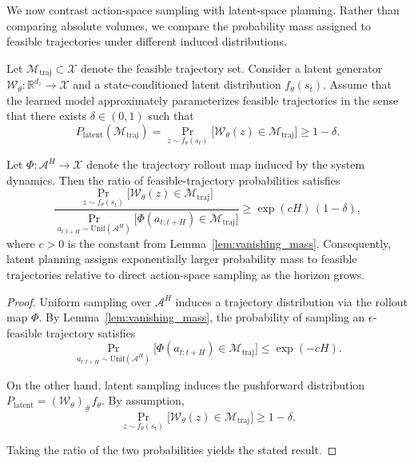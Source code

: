 

We now contrast action-space sampling with latent-space planning.
Rather than comparing absolute volumes,
we compare the probability mass assigned to feasible trajectories
under different induced distributions.

\begin{proposition}
\label{prop:latent_reweighting}
Let $\mathcal{M}_{\mathrm{traj}} \subset \mathcal{X}$ denote the feasible trajectory set.
Consider a latent generator
$\mathcal{W}_\theta : \mathbb{R}^{d_z} \to \mathcal{X}$
and a state-conditioned latent distribution $f_\theta(s_t)$.
Assume that the learned model approximately parameterizes feasible trajectories
in the sense that there exists $\delta \in (0,1)$ such that
\begin{equation}
P_{\mathrm{latent}}(\mathcal{M}_{\mathrm{traj}})
=
\Pr_{z \sim f_\theta(s_t)}
\big[
\mathcal{W}_\theta(z) \in \mathcal{M}_{\mathrm{traj}}
\big]
\ge 1 - \delta .
\end{equation}

Let $\Phi : \mathcal{A}^H \to \mathcal{X}$ denote the trajectory rollout map
induced by the system dynamics.
Then the ratio of feasible-trajectory probabilities satisfies
\begin{equation}
\frac{
\Pr_{z \sim f_\theta(s_t)}
\big[
\mathcal{W}_\theta(z) \in \mathcal{M}_{\mathrm{traj}}
\big]
}{
\Pr_{a_{t:t+H} \sim \mathrm{Unif}(\mathcal{A}^H)}
\big[
\Phi(a_{t:t+H}) \in \mathcal{M}_{\mathrm{traj}}
\big]
}
\ge
\exp(cH)\,(1-\delta),
\end{equation}
where $c>0$ is the constant from Lemma~\ref{lem:vanishing_mass}.
Consequently, latent planning assigns exponentially larger probability mass
to feasible trajectories relative to direct action-space sampling
as the horizon grows.
\end{proposition}

\begin{proof}
Uniform sampling over $\mathcal{A}^H$ induces a trajectory distribution
via the rollout map $\Phi$.
By Lemma~\ref{lem:vanishing_mass},
the probability of sampling an $\epsilon$-feasible trajectory satisfies
\[
\Pr_{a_{t:t+H} \sim \mathrm{Unif}(\mathcal{A}^H)}
\big[
\Phi(a_{t:t+H}) \in \mathcal{M}_{\mathrm{traj}}
\big]
\le \exp(-cH).
\]

On the other hand, latent sampling induces the pushforward distribution
$P_{\mathrm{latent}} = (\mathcal{W}_\theta)_\# f_\theta$.
By assumption,
\[
\Pr_{z \sim f_\theta(s_t)}
\big[
\mathcal{W}_\theta(z) \in \mathcal{M}_{\mathrm{traj}}
\big]
\ge 1 - \delta .
\]

Taking the ratio of the two probabilities yields the stated result.
\end{proof}

